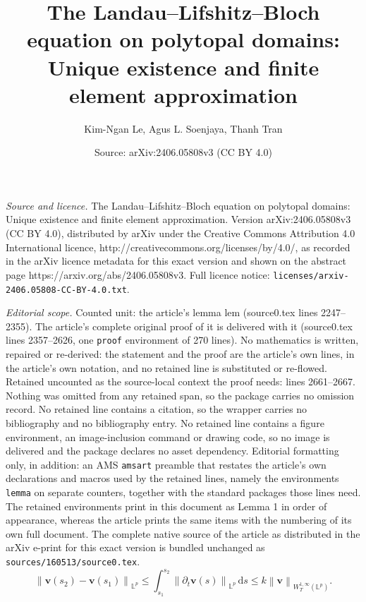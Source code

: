 \documentclass[10pt,a4paper]{amsart}
\title{The Landau--Lifshitz--Bloch equation on polytopal domains: Unique existence and finite element approximation}
\author{Kim-Ngan Le, Agus L. Soenjaya, Thanh Tran}
\date{Source: arXiv:2406.05808v3 (CC BY 4.0)}
\newcommand{\bb}{\mathbb}
\newcommand{\bff}{\boldsymbol}
\newcommand{\ds}{\mathrm{d}s}
\newcommand{\norm}[2]{\left\|{#1}\right\|_{#2}}
\begin{document}
\maketitle

\noindent\emph{Source and licence.} The Landau--Lifshitz--Bloch equation on polytopal domains: Unique existence and finite element approximation. Version arXiv:2406.05808v3 (CC BY 4.0), distributed by arXiv under the Creative Commons Attribution 4.0 International licence, http://creativecommons.org/licenses/by/4.0/, as recorded in the arXiv licence metadata for this exact version and shown on the abstract page https://arxiv.org/abs/2406.05808v3. Full licence notice: \texttt{licenses/arxiv-2406.05808-CC-BY-4.0.txt}.\par\smallskip

\noindent\textit{Editorial scope.} Counted unit: the article's lemma lem (source0.tex lines 2247--2355). The article's complete original proof of it is delivered with it (source0.tex lines 2357--2626, one \texttt{proof} environment of 270 lines). No mathematics is written, repaired or re-derived: the statement and the proof are the article's own lines, in the article's own notation, and no retained line is substituted or re-flowed.  Retained uncounted as the source-local context the proof needs: lines 2661--2667.  Nothing was omitted from any retained span, so the package carries no omission record.  No retained line contains a citation, so the wrapper carries no bibliography and no bibliography entry.  No retained line contains a figure environment, an image-inclusion command or drawing code, so no image is delivered and the package declares no asset dependency.  Editorial formatting only, in addition: an AMS \texttt{amsart} preamble that restates the article's own declarations and macros used by the retained lines, namely the environments \texttt{lemma} on separate counters, together with the standard packages those lines need.  The retained environments print in this document as Lemma 1 in order of appearance, whereas the article prints the same items with the numbering of its own full document.  The complete native source of the article as distributed in the arXiv e-print for this exact version is bundled unchanged as \texttt{sources/160513/source0.tex}.
\begin{equation}\label{equ:uj uj1}
	\norm{\bff{v}(s_2)-\bff{v}(s_1)}{\bb{L}^p}
	\leq
	\int_{s_1}^{s_2} \norm{\partial_t \bff{v} (s)}{\bb{L}^p}\, \ds
	\leq
	k \norm{\bff{v}}{W^{1,\infty}_T(\bb{L}^p)}.
\end{equation}
\end{document}
